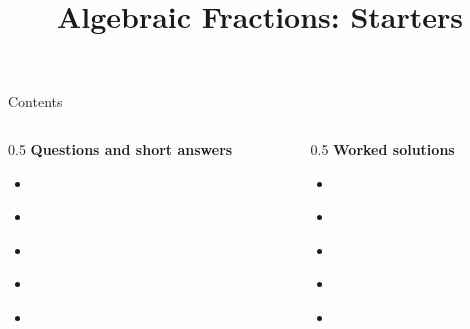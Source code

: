\documentclass{beamer}
\title{Algebraic Fractions: Starters}
\author{}
\date{}
\begin{document}
\frame{\titlepage}

\begin{frame}{Contents}
\small
\begin{columns}[T]
\begin{column}{0.5\textwidth}
\textbf{Questions and short answers}
\begin{itemize}
\item \hyperlink{q-st1}{}
\item \hyperlink{q-st2}{}
\item \hyperlink{q-st3}{}
\item \hyperlink{q-st4}{}
\item \hyperlink{q-st5}{}
\end{itemize}
\end{column}
\begin{column}{0.5\textwidth}
\textbf{Worked solutions}
\begin{itemize}
\item \hyperlink{work-st1}{}
\item \hyperlink{work-st2}{}
\item \hyperlink{work-st3}{}
\item \hyperlink{work-st4}{}
\item \hyperlink{work-st5}{}
\end{itemize}
\end{column}
\end{columns}
\end{frame}
\end{document}
